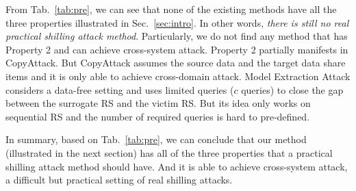 From Tab.~\ref{tab:pre}, we can see that 
none of the existing methods have all the three properties illustrated in Sec.~\ref{sec:intro}.
In other words, \emph{there is still no real practical shilling attack method}.
Particularly, we do not find any method that has Property 2 and can achieve cross-system attack. 
Property 2 partially manifests in CopyAttack.
But CopyAttack assumes the source data and the target data share items and it is only able to achieve cross-domain attack.
Model Extraction Attack considers a data-free setting and uses limited queries ($c$ queries) to close the gap between the surrogate RS and the victim RS.
But its idea only works on sequential RS and the number of required queries is hard to pre-defined.


In summary, based on Tab.~\ref{tab:pre}, we can conclude that our method \ours (illustrated in the next section) has all of the three properties that a practical shilling attack method should have. 
And it is able to achieve cross-system attack, a difficult but practical setting of real shilling attacks.
